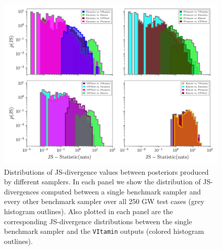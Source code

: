 \begin{figure}
    \includegraphics[width=\textwidth]{hist-JS.png}
    \caption[Distributions of the JS-divergence 
    values across 14 parameters between posteriors produced by different
    samplers.]{\label{fig:kl_results} Distributions of \ac{JS}-divergence 
    values between posteriors produced by different samplers. In each 
    panel we show the distribution of \ac{JS}-divergences computed 
    between a single benchmark sampler and every other benchmark sampler 
    over all 250 \ac{GW} test cases (grey histogram outlines). 
    Also plotted in each 
    panel are the corresponding \ac{JS}-divergence distributions 
    between the single benchmark sampler and the \texttt{VItamin} 
    outputs (colored histogram outlines).}

\end{figure}


